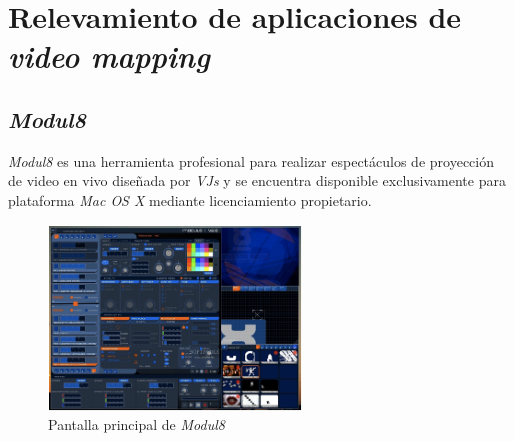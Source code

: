 ﻿\chapter{Relevamiento de aplicaciones de \emph{video mapping}}
\label{chapter:aplicaciones}
\section{\emph{Modul8}}
\emph{Modul8} \cite{Module8} es una herramienta profesional para realizar espectáculos de proyección de video en vivo diseñada por \emph{VJs} y se encuentra disponible exclusivamente para plataforma \emph{Mac OS X} mediante licenciamiento propietario.%

\begin{figure}[H]
  \centering
    \includegraphics[width=0.6\textwidth]{./Apendices/Cap3_aplicaciones/apps-modul8.png}
  \caption{Pantalla principal de \emph{Modul8}}%
  \label{fig:Apps-Module8}
\end{figure}

